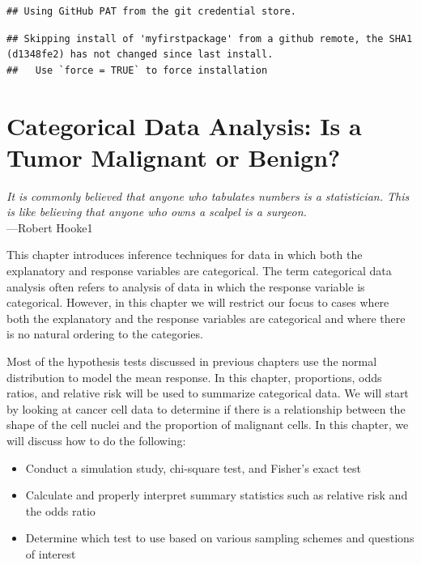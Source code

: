 \documentclass[
]{book}
\providecommand{\tightlist}{%
  \setlength{\itemsep}{0pt}\setlength{\parskip}{0pt}}
\begin{document}
\begin{verbatim}
## Using GitHub PAT from the git credential store.
\end{verbatim}

\begin{verbatim}
## Skipping install of 'myfirstpackage' from a github remote, the SHA1 (d1348fe2) has not changed since last install.
##   Use `force = TRUE` to force installation
\end{verbatim}

\hypertarget{categorical-data-analysis-is-a-tumor-malignant-or-benign}{%
\chapter{Categorical Data Analysis: Is a Tumor Malignant or Benign?}\label{categorical-data-analysis-is-a-tumor-malignant-or-benign}}

{ \emph{It is commonly believed that anyone who tabulates numbers is a statistician. This is like believing that anyone who owns a scalpel is a surgeon.}}\\
{ ---Robert Hooke1}

This chapter introduces inference techniques for data in which both the explanatory and
response variables are categorical. The term categorical data analysis often refers to
analysis of data in which the response variable is categorical. However, in this chapter
we will restrict our focus to cases where both the explanatory and the response variables are
categorical and where there is no natural ordering to the categories.

Most of the hypothesis tests discussed in previous chapters use the normal distribution to
model the mean response. In this chapter, proportions, odds ratios, and relative risk will be
used to summarize categorical data. We will start by looking at cancer cell data to determine
if there is a relationship between the shape of the cell nuclei and the proportion of malignant
cells. In this chapter, we will discuss how to do the following:

\begin{itemize}
\tightlist
\item
  Conduct a simulation study, chi-square test, and Fisher's exact test
\item
  Calculate and properly interpret summary statistics such as relative risk and the odds ratio
\item
  Determine which test to use based on various sampling schemes and questions of interest
\end{itemize}
\end{document}
